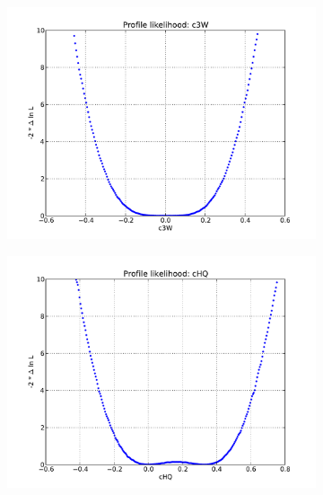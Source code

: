 \begin{figure}[!htb]
  \begin{subfigure}{0.5\textwidth}
    \includegraphics[width=\textwidth]{figures/eight-TeV/NP/c3W_NLL}
    \caption{}
  \end{subfigure}%
  \begin{subfigure}{0.5\textwidth}
    \includegraphics[width=\textwidth]{figures/eight-TeV/NP/cHQ_NLL}
    \caption{}
  \end{subfigure}
  \begin{subfigure}{0.5\textwidth}

\end{subfigure}
\end{figure}
